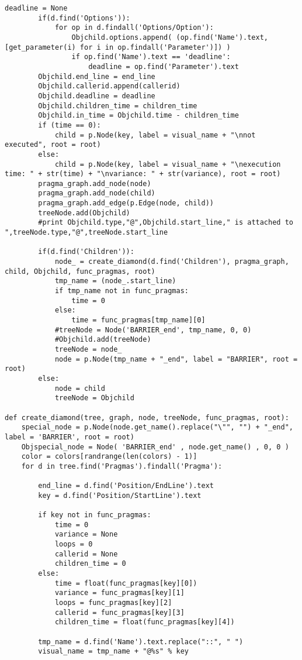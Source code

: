 \documentclass[a4paper,11pt,twoside]{book}
\begin{document}
\begin{lstlisting}[language=CCC, caption=pargraph.py]
		deadline = None
		if(d.find('Options')):
			for op in d.findall('Options/Option'):
				Objchild.options.append( (op.find('Name').text,[get_parameter(i) for i in op.findall('Parameter')]) )
				if op.find('Name').text == 'deadline':
					deadline = op.find('Parameter').text
		Objchild.end_line = end_line
		Objchild.callerid.append(callerid)
		Objchild.deadline = deadline
		Objchild.children_time = children_time
		Objchild.in_time = Objchild.time - children_time
		if (time == 0):
			child = p.Node(key, label = visual_name + "\nnot executed", root = root)
		else:
			child = p.Node(key, label = visual_name + "\nexecution time: " + str(time) + "\nvariance: " + str(variance), root = root)
		pragma_graph.add_node(node)
		pragma_graph.add_node(child)
		pragma_graph.add_edge(p.Edge(node, child))
		treeNode.add(Objchild)
		#print Objchild.type,"@",Objchild.start_line," is attached to ",treeNode.type,"@",treeNode.start_line

		if(d.find('Children')):
			node_ = create_diamond(d.find('Children'), pragma_graph, child, Objchild, func_pragmas, root)
			tmp_name = (node_.start_line)
			if tmp_name not in func_pragmas:
				time = 0
			else:
				time = func_pragmas[tmp_name][0]
			#treeNode = Node('BARRIER_end', tmp_name, 0, 0)
			#Objchild.add(treeNode)
			treeNode = node_
			node = p.Node(tmp_name + "_end", label = "BARRIER", root = root)
		else:
			node = child
			treeNode = Objchild

def create_diamond(tree, graph, node, treeNode, func_pragmas, root):
	special_node = p.Node(node.get_name().replace("\"", "") + "_end", label = 'BARRIER', root = root)
	Objspecial_node = Node( 'BARRIER_end' , node.get_name() , 0, 0 )
	color = colors[randrange(len(colors) - 1)]
	for d in tree.find('Pragmas').findall('Pragma'):

		end_line = d.find('Position/EndLine').text
		key = d.find('Position/StartLine').text

		if key not in func_pragmas:
			time = 0
			variance = None
			loops = 0
			callerid = None
			children_time = 0
		else:
			time = float(func_pragmas[key][0])
			variance = func_pragmas[key][1]
			loops = func_pragmas[key][2]
			callerid = func_pragmas[key][3]
			children_time = float(func_pragmas[key][4])

		tmp_name = d.find('Name').text.replace("::", " ")
		visual_name = tmp_name + "@%s" % key


\end{lstlisting}
\end{document}
